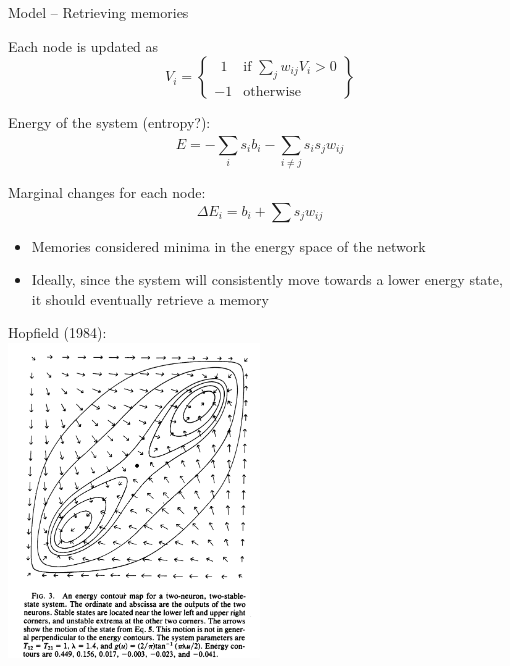 \documentclass[10pt]{beamer}
\begin{document}
\begin{frame}{Model -- Retrieving memories}

 	Each node is updated as 
    \begin{equation}
    V_i = 
    \left\{
        \begin{array}{lr}
           \ \   1 & \text{if } \sum^{}_{j} w_{ij} V_i > 0\\
            -1 & \text{otherwise} 
        \end{array}
    \right\} 
    \end{equation}

	Energy of the system (entropy?):
    	\begin{equation}
        		E = -\sum^{}_{i}s_i b_i - \sum^{}_{i \neq j}s_i s_j w_{ij}
    	\end{equation}
	
	Marginal changes for each node:	
    	\begin{equation}
 	       \Delta E_i = b_i + \sum s_j w_{ij}
     	\end{equation}
	

	
	\begin{itemize}
	\item Memories considered minima in the energy space of the network
	\item Ideally, since the system will consistently move towards a lower energy state, it should eventually retrieve a memory
	\end{itemize}
\end{frame}

\begin{frame}
	Hopfield (1984):\\
	\centering
	\includegraphics[width=0.5\textwidth]{"../img/hopfield_phase_space.png"}
\end{frame}
\end{document}
